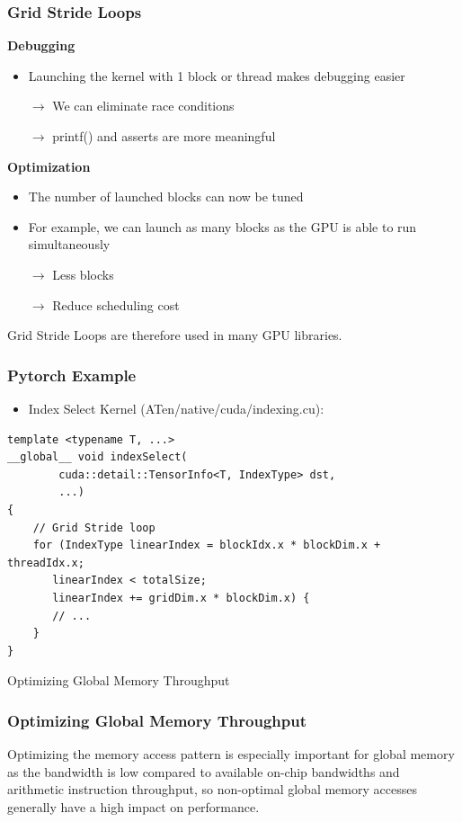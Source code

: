 \documentclass[aspectratio=169,handout]{beamer}
\begin{document}
\begin{frame}[fragile]
\frametitle{Grid Stride Loops}
\textbf{Debugging}
\begin{itemize}
\item Launching the kernel with 1 block or thread makes debugging easier
\item[$\rightarrow$] We can eliminate race conditions 
\item[$\rightarrow$] printf() and asserts are more meaningful
\end{itemize}

\textbf{Optimization}
\begin{itemize}
\item The number of launched blocks can now be tuned
\item For example, we can launch as many blocks as the GPU is able to run simultaneously 
\item[$\rightarrow$] Less blocks
\item[$\rightarrow$] Reduce scheduling cost
\end{itemize}
Grid Stride Loops are therefore used in many GPU libraries.
\end{frame}


\begin{frame}[fragile]
\frametitle{Pytorch Example}
\begin{itemize}
\item Index Select Kernel (ATen/native/cuda/indexing.cu):
\end{itemize}

\begin{lstlisting}
template <typename T, ...>
__global__ void indexSelect(
		cuda::detail::TensorInfo<T, IndexType> dst,
		...) 
{
	// Grid Stride loop
	for (IndexType linearIndex = blockIdx.x * blockDim.x + threadIdx.x;
	   linearIndex < totalSize;
	   linearIndex += gridDim.x * blockDim.x) {
	   // ...
	}
}
\end{lstlisting}
\end{frame}


\frame
{
\begin{center}
\Large Optimizing Global Memory Throughput
\end{center}
}


\begin{frame}[fragile]
\frametitle{Optimizing Global Memory Throughput}

\begin{mdframed}[frametitle={Cuda Programming Guide:}]
Optimizing the memory access pattern is especially important for global memory as the bandwidth is low compared to available on-chip bandwidths and arithmetic instruction throughput, so non-optimal global memory accesses generally have a high impact on performance. 
\end{mdframed}

\end{frame}
\end{document}
